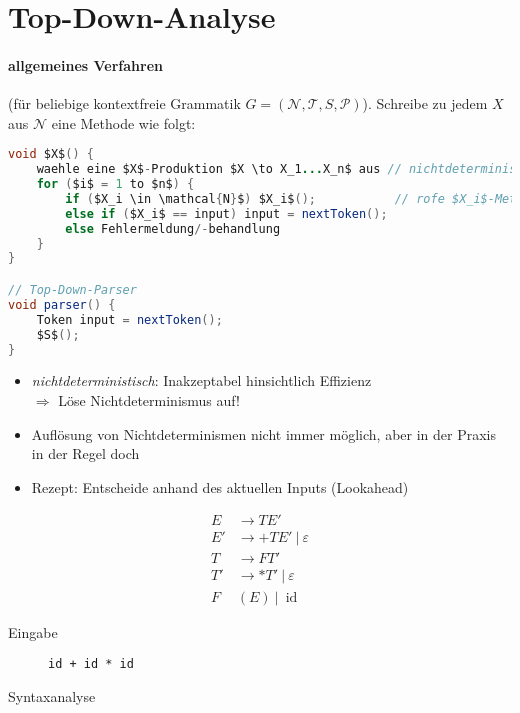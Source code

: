 \section{Top-Down-Analyse}
\paragraph{allgemeines Verfahren} (für beliebige kontextfreie Grammatik $G = (\mathcal{N}, \mathcal{T}, S, \mathcal{P})$). Schreibe zu jedem $X$ aus $\mathcal{N}$ eine Methode wie folgt:
\begin{lstlisting}[language=Java,mathescape=true,morekeywords={to}]
void $X$() {
    waehle eine $X$-Produktion $X \to X_1...X_n$ aus // nichtdeterministisch 
    for ($i$ = 1 to $n$) {
        if ($X_i \in \mathcal{N}$) $X_i$();           // rofe $X_i$-Methode rekursiv auf
        else if ($X_i$ == input) input = nextToken();
        else Fehlermeldung/-behandlung
    }
}

// Top-Down-Parser
void parser() {
    Token input = nextToken();
    $S$();
}
\end{lstlisting}

\begin{itemize}
 \item \emph{nichtdeterministisch}: Inakzeptabel hinsichtlich Effizienz\\
         $\Rightarrow$ Löse Nichtdeterminismus auf!
 \item Auflösung von Nichtdeterminismen nicht immer möglich, aber in der Praxis in der Regel doch
 \item Rezept: Entscheide anhand des aktuellen Inputs (Lookahead)
\end{itemize}
\Bsp
\begin{align*}
 E &\to TE'\\
 E' &\to +TE'\ |\ \varepsilon \\
 T &\to FT' \\
 T' &\to *T'\ |\ \varepsilon \\
 F & (E)\ |\ \operatorname{id}
\end{align*}
\begin{description}
 \item[Eingabe] \texttt{id + id * id}
 \item[Syntaxanalyse]
 \begin{center}
 \end{center}
\end{description}
